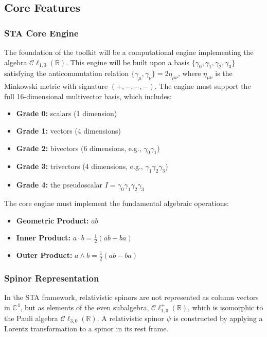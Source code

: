 \documentclass[11pt, letterpaper]{article}
\theoremstyle{definition}
\theoremstyle{remark}
\begin{document}
\subsection{Core Features}

\subsubsection{STA Core Engine}
The foundation of the toolkit will be a computational engine implementing the
algebra $\mathcal{C}\ell_{1,3}(\mathbb{R})$. This engine will be built upon a
basis $\{\gamma_0, \gamma_1, \gamma_2, \gamma_3\}$ satisfying the
anticommutation relation $\{\gamma_\mu, \gamma_\nu\} = 2\eta_{\mu\nu}$, where
$\eta_{\mu\nu}$ is the Minkowski metric with signature $(+,-,-,-)$. The engine
must support the full 16-dimensional multivector basis, which includes:
\begin{itemize}
	\item \textbf{Grade 0:} scalars (1 dimension)
	\item \textbf{Grade 1:} vectors (4 dimensions)
	\item \textbf{Grade 2:} bivectors (6 dimensions, e.g., $\gamma_0\gamma_1$)
	\item \textbf{Grade 3:} trivectors (4 dimensions, e.g., $\gamma_1\gamma_2\gamma_3$)
	\item \textbf{Grade 4:} the pseudoscalar $I = \gamma_0\gamma_1\gamma_2\gamma_3$
\end{itemize}

The core engine must implement the fundamental algebraic operations:
\begin{itemize}
	\item \textbf{Geometric Product:} $ab$
	\item \textbf{Inner Product:} $a \cdot b = \frac{1}{2}(ab + ba)$
	\item \textbf{Outer Product:} $a \wedge b = \frac{1}{2}(ab - ba)$
\end{itemize}

\subsubsection{Spinor Representation}
In the STA framework, relativistic spinors are not represented as column vectors
in $\mathbb{C}^4$, but as elements of the even subalgebra,
$\mathcal{C}\ell^+_{1,3}(\mathbb{R})$, which is isomorphic to the Pauli algebra
$\mathcal{C}\ell_{3,0}(\mathbb{R})$. A relativistic spinor $\psi$ is constructed
by applying a Lorentz transformation to a spinor in its rest frame.
\end{document}
